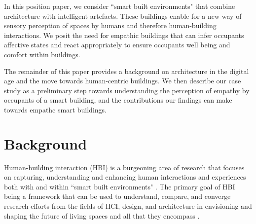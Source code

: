 \documentclass[manuscript, anonymous, review]{acmart}
\begin{document}
In this position paper, we consider ``smart built environments" that combine architecture with intelligent artefacts. These buildings enable for a new way of sensory perception of spaces by humans and therefore human-building interactions. We posit the need for empathic buildings that can infer occupants affective states and react appropriately to ensure occupants well being and comfort within buildings. 

The remainder of this paper provides a background on architecture in the digital age and the move towards human-centric buildings. We then describe our case study as a preliminary step towards understanding the perception of empathy by occupants of a smart building, and the contributions our findings can make towards empathc smart buildings.




\section{Background}
Human-building interaction (HBI) is a burgeoning area of research that focuses on capturing, understanding and enhancing human interactions and experiences both with and within ``smart built environments" \cite{alavi2016future}. The primary goal of HBI being a framework that can be used to understand, compare, and converge research efforts from the fields of HCI, design, and architecture in envisioning and shaping the future of living spaces and all that they encompass \cite{nembrini2017human, alavi2018artifacts}. 

\end{document}
